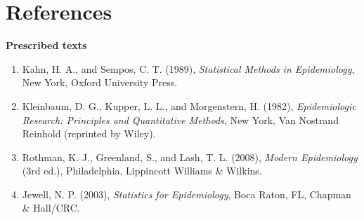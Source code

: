 \documentclass[11pt,a4paper]{article}
\numberwithin{equation}{section}
\theoremstyle{definition}
\newcommand{\subhead}[1]{%
  \par\medskip\noindent\textbf{#1}\par\nobreak\smallskip}
\begin{document}
\section*{References}

\subhead{Prescribed texts}
\begin{enumerate}
\item Kahn, H. A., and Sempos, C. T. (1989), \emph{Statistical Methods in Epidemiology}, New York, Oxford University Press.
\item Kleinbaum, D. G., Kupper, L. L., and Morgenstern, H. (1982), \emph{Epidemiologic Research: Principles and Quantitative Methods}, New York,
Van Nostrand Reinhold (reprinted by Wiley).
\item Rothman, K. J., Greenland, S., and Lash, T. L. (2008), \emph{Modern Epidemiology} (3rd ed.), Philadelphia, Lippincott Williams \& Wilkins.
\item Jewell, N. P. (2003), \emph{Statistics for Epidemiology}, Boca Raton, FL, Chapman \& Hall/CRC.
\end{enumerate}
\end{document}

